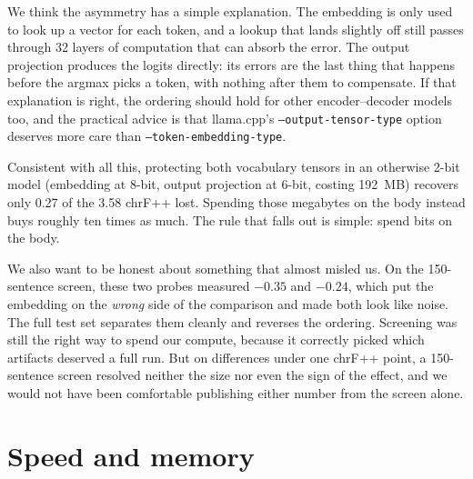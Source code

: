 \documentclass[10pt,twocolumn]{article}
\begin{document}
We think the asymmetry has a simple explanation. The embedding is only
used to look up a vector for each token, and a lookup that lands slightly
off still passes through 32 layers of computation that can absorb the
error. The output projection produces the logits directly: its errors are
the last thing that happens before the argmax picks a token, with nothing
after them to compensate. If that explanation is right, the ordering
should hold for other encoder--decoder models too, and the practical
advice is that llama.cpp's \texttt{--output-tensor-type} option deserves
more care than \texttt{--token-embedding-type}.

Consistent with all this, protecting both vocabulary tensors in an
otherwise 2-bit model (embedding at 8-bit, output projection at 6-bit,
costing 192~MB) recovers only 0.27 of the 3.58 chrF++ lost. Spending
those megabytes on the body instead buys roughly ten times as much. The
rule that falls out is simple: spend bits on the body.

We also want to be honest about something that almost misled us. On the
150-sentence screen, these two probes measured $-0.35$ and $-0.24$, which
put the embedding on the \emph{wrong} side of the comparison and made
both look like noise. The full test set separates them cleanly and
reverses the ordering. Screening was still the right way to spend our
compute, because it correctly picked which artifacts deserved a full run.
But on differences under one chrF++ point, a 150-sentence screen resolved
neither the size nor even the sign of the effect, and we would not have
been comfortable publishing either number from the screen alone.

\section{Speed and memory}
\label{sec:speed}
\end{document}
